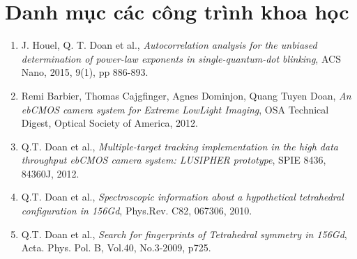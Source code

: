 \chapter*{Danh mục các công trình khoa học}

\begin{enumerate}

\item J. Houel, Q. T. Doan et al., \textit{Autocorrelation analysis for the unbiased determination of power-law exponents in single-quantum-dot blinking}, ACS Nano, 2015, 9(1), pp 886-893.

\item Remi Barbier, Thomas Cajgfinger, Agnes Dominjon, Quang Tuyen Doan, \textit{An ebCMOS camera system for Extreme LowLight Imaging}, OSA Technical Digest, Optical Society of America, 2012.

\item Q.T. Doan et al., \textit{Multiple-target tracking implementation in the high data throughput ebCMOS camera system: LUSIPHER prototype}, SPIE 8436, 84360J, 2012.

\item Q.T. Doan et al., \textit{Spectroscopic information about a hypothetical tetrahedral configuration in 156Gd}, Phys.Rev. C82, 067306, 2010.

\item Q.T. Doan et al., \textit{Search for fingerprints of Tetrahedral symmetry in 156Gd}, Acta. Phys. Pol. B, Vol.40, No.3-2009, p725.

\end{enumerate}